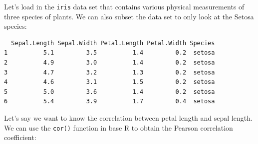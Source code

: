 \documentclass[
  letterpaper,
  DIV=11,
  numbers=noendperiod]{scrreprt}
\newenvironment{Shaded}{}{}
\newcommand{\CommentTok}[1]{\textcolor[rgb]{0.54,0.53,0.53}{#1}}
\newcommand{\FunctionTok}[1]{\textcolor[rgb]{0.39,0.29,0.61}{#1}}
\newcommand{\NormalTok}[1]{\textcolor[rgb]{0.12,0.11,0.11}{#1}}
\newcommand{\OtherTok}[1]{\textcolor[rgb]{0.00,0.43,0.16}{#1}}
\newcommand{\SpecialCharTok}[1]{\textcolor[rgb]{0.24,0.68,0.91}{#1}}
\newcommand{\StringTok}[1]{\textcolor[rgb]{0.75,0.01,0.01}{#1}}
\begin{document}
\begin{tcolorbox}[enhanced jigsaw, opacityback=0, coltitle=black, toprule=.15mm, colframe=quarto-callout-note-color-frame, bottomtitle=1mm, rightrule=.15mm, colbacktitle=quarto-callout-note-color!10!white, left=2mm, bottomrule=.15mm, breakable, title={Computing Correlations in R}, colback=white, opacitybacktitle=0.6, titlerule=0mm, arc=.35mm, leftrule=.75mm, toptitle=1mm]

Let's load in the \texttt{iris} data set that contains various physical
measurements of three species of plants. We can also subset the data set
to only look at the Setosa species:

\begin{Shaded}
\end{Shaded}

\begin{verbatim}
  Sepal.Length Sepal.Width Petal.Length Petal.Width Species
1          5.1         3.5          1.4         0.2  setosa
2          4.9         3.0          1.4         0.2  setosa
3          4.7         3.2          1.3         0.2  setosa
4          4.6         3.1          1.5         0.2  setosa
5          5.0         3.6          1.4         0.2  setosa
6          5.4         3.9          1.7         0.4  setosa
\end{verbatim}

Let's say we want to know the correlation between petal length and sepal
length. We can use the \texttt{cor()} function in base R to obtain the
Pearson correlation coefficient:

\begin{Shaded}
\end{Shaded}


\end{tcolorbox}
\end{document}
